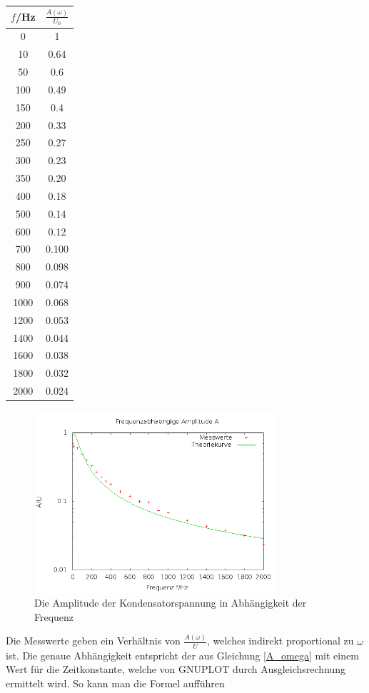 \begin{minipage}{0.2\textwidth}
\begin{tabular}{c|c}
$f$/Hz & $\frac{A(\omega)}{U_0}$\\
\hline
0 &	1\\
10 &	0.64\\
50 &	0.6\\
100 &	0.49\\
150 &	0.4\\
200 &	0.33\\
250 &	0.27\\
300 &	0.23\\
350 &	0.20\\
400 &	0.18\\
500 &	0.14\\
600 &	0.12\\
700 &	0.100\\
800 &	0.098\\
900 &	0.074\\
1000 &	0.068\\
1200 &	0.053\\
1400 &	0.044\\
1600 &	0.038\\
1800 &	0.032\\
2000 &	0.024
\end{tabular}
\end{minipage}
\begin{figure}[htbp]
\includegraphics[width=0.8\textwidth] {_pics/RC2.png}
\centering
\caption{Die Amplitude der Kondensatorspannung in Abhängigkeit der Frequenz}
\end{figure}

Die Messwerte geben ein Verhältnis von $\frac{A(\omega)}{U}$, welches indirekt proportional zu $\omega$ ist. Die genaue
Abhängigkeit entspricht der aus Gleichung \eqref{A_omega} mit einem Wert für die Zeitkonstante, welche von GNUPLOT 
durch Ausgleichsrechnung ermittelt wird. So kann man die Formel aufführen

